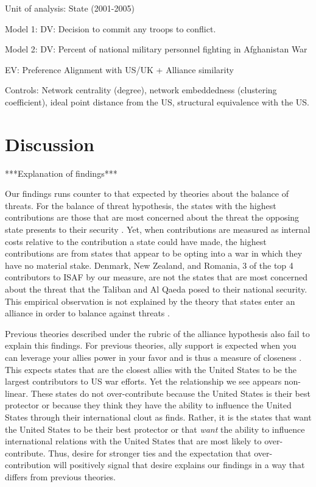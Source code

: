 \documentclass[12pt,letterpaper]{article}
\begin{document}
	Unit of analysis: State (2001-2005)

	Model 1: DV: Decision to commit any troops to conflict.

	Model 2: DV: Percent of national military personnel fighting in Afghanistan War

	EV: Preference Alignment with US/UK + Alliance similarity

	Controls: Network centrality (degree), network embeddedness (clustering coefficient), ideal point distance from the US, structural equivalence with the US.

\section{Discussion}

	***Explanation of findings***

	Our findings runs counter to that expected by theories about the balance of threats. For the balance of threat hypothesis, the states with the highest contributions are those that are most concerned about the threat the opposing state presents to their security \citep{haesebrouck_democraticparticipationair_2016}. Yet, when contributions are measured as internal costs relative to the contribution a state could have made, the highest contributions are from states that appear to be opting into a war in which they have no material stake. Denmark, New Zealand, and Romania, 3 of the top 4 contributors to ISAF by our measure, are not the states that are most concerned about the threat that the Taliban and Al Qaeda posed to their national security. This empirical observation is not explained by the theory that states enter an alliance in order to balance against threats \citep{walt_originsalliance_1987}.

	Previous theories described under the rubric of the alliance hypothesis also fail to explain this findings. For previous theories, ally support is expected when you can leverage your allies power in your favor and is thus a measure of closeness \citep{davidson_neoclassicalrealistexplanation_2011}. This expects states that are the closest allies with the United States to be the largest contributors to US war efforts. Yet the relationship we see appears non-linear. These states do not over-contribute because the United States is their best protector or because they think they have the ability to influence the United States through their international clout as \citet{ringsmose_natoburdensharingredux_2010} finds. Rather, it is the states that want the United States to be their best protector or that \textit{want} the ability to influence international relations with the United States that are most likely to over-contribute. Thus, desire for stronger ties and the expectation that over-contribution will positively signal that desire explains our findings in a way that differs from previous theories.
\end{document}
